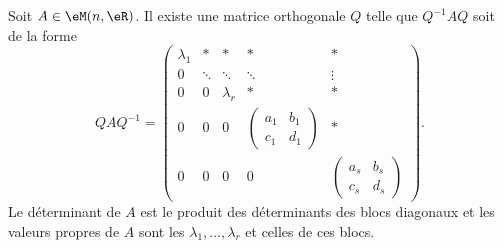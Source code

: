 \begin{lemma}  \label{LemSchureRelnrqfiy}
    Soit \( A\in\eM(n,\eR)\). Il existe une matrice orthogonale \( Q\) telle que \( Q^{-1}AQ\) soit de la forme
    \begin{equation}        \label{EqMtrTSqRTA}
        QAQ^{-1}=\begin{pmatrix}
            \lambda_1    &   *    &   *    &   *    &   *\\  
            0    &   \ddots    &   \ddots    &   \ddots    &   \vdots\\  
            0    &   0    &   \lambda_r    &   *    &   *\\  
            0    &   0    &   0    &   \begin{pmatrix}
                a_1    &   b_1    \\ 
                c_1    &   d_1    
            \end{pmatrix}&   *\\  
            0    &   0    &  0     &   0    &   \begin{pmatrix}
                a_s    &   b_s    \\ 
                c_s    &   d_s    
            \end{pmatrix}
        \end{pmatrix}.
    \end{equation}
    Le déterminant de \( A\) est le produit des déterminants des blocs diagonaux et les valeurs propres de \( A\) sont les \( \lambda_1,\ldots, \lambda_r\) et celles de ces blocs.
\end{lemma}

